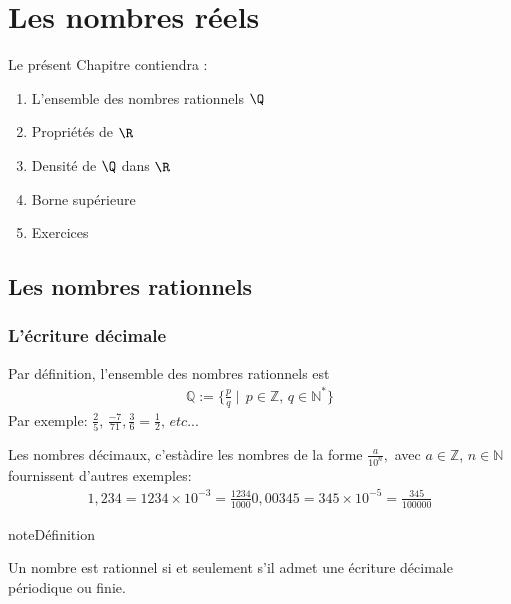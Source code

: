 \documentclass[letterpaper,10pt,french]{jupyterBook}
\begin{document}
\chapter{Les nombres réels}
\label{\detokenize{R:les-nombres-reels}}\label{\detokenize{R::doc}}
\sphinxAtStartPar
Le présent Chapitre contiendra :
\begin{enumerate}
%
\item {} 
\sphinxAtStartPar
L’ensemble des nombres rationnels \(\Q\)

\item {} 
\sphinxAtStartPar
Propriétés de \(\R\)

\item {} 
\sphinxAtStartPar
Densité de \(\Q\) dans \(\R\)

\item {} 
\sphinxAtStartPar
Borne supérieure

\item {} 
\sphinxAtStartPar
Exercices

\end{enumerate}


\section{Les nombres rationnels}
\label{\detokenize{rationnels:les-nombres-rationnels}}\label{\detokenize{rationnels::doc}}

\subsection{L’écriture décimale}
\label{\detokenize{rationnels:l-ecriture-decimale}}
\sphinxAtStartPar
Par définition, l’ensemble des nombres rationnels est
\begin{equation*}
\begin{split}
\mathbb{Q}:=\{\frac{p}{q}\mid\, p\in \mathbb{Z},\,q\in \mathbb{N}^{*}\}
\end{split}
\end{equation*}
\sphinxAtStartPar
Par exemple: \(\frac{2}{5},\,\frac{-7}{71},\frac{3}{6}=\frac{1}{2},\,etc...\)

\sphinxAtStartPar
Les nombres décimaux, c’est\sphinxhyphen{}à\sphinxhyphen{}dire les nombres de la forme \(\frac{a}{10^{n}},\)  avec \(a\in \mathbb{Z}\), \(n\in \mathbb{N}\) fournissent d’autres exemples:
\begin{equation*}
\begin{split}
1,234 = 1234\times 10^{-3} =\frac{1234}{1000}
0,00345 = 345\times 10^{-5}=\frac{345}{100000}
\end{split}
\end{equation*}
\begin{sphinxadmonition}{note}{Définition}

\sphinxAtStartPar
Un nombre est rationnel si et seulement s’il admet une écriture décimale périodique ou finie.
\end{sphinxadmonition}
\end{document}
